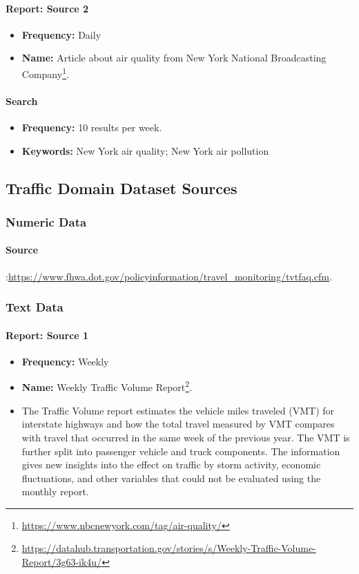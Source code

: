 \paragraph{Report: Source 2}
\begin{itemize}
    \item \textbf{Frequency:} Daily
    \item \textbf{Name:} Article about air quality from New York National Broadcasting Company\footnote{\url{https://www.nbcnewyork.com/tag/air-quality/}}.
\end{itemize}
\paragraph{Search}
\begin{itemize}
    \item \textbf{Frequency:} 10 results per week.
    \item \textbf{Keywords:} New York air quality; New York air pollution
\end{itemize}


\subsection{ Traffic Domain Dataset Sources}


\subsubsection{Numeric Data}
\paragraph{Source}:\url{https://www.fhwa.dot.gov/policyinformation/travel_monitoring/tvtfaq.cfm}.

\subsubsection{Text Data}
\paragraph{Report: Source 1}
\begin{itemize}
    \item \textbf{Frequency:} Weekly
    \item \textbf{Name:} Weekly Traffic Volume Report\footnote{\href{https://datahub.transportation.gov/stories/s/Weekly-Traffic-Volume-Report/3g63-ik4u/}{https://datahub.transportation.gov/stories/s/Weekly-Traffic-Volume-Report/3g63-ik4u/}}.
    \item The Traffic Volume report estimates the vehicle miles traveled (VMT) for interstate highways and how the total travel measured by VMT compares with travel that occurred in the same week of the previous year. The VMT is further split into passenger vehicle and truck components. The information gives new insights into the effect on traffic by storm activity, economic fluctuations, and other variables that could not be evaluated using the monthly report.
\end{itemize}
